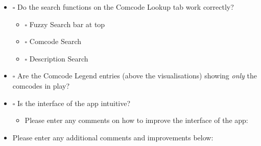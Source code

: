 \documentclass[11pt]{article}
\begin{document}
\vspace*{2cm}

\begin{itemize}
\item $\square$ Do the search functions on the Comcode Lookup tab work correctly?
\begin{itemize}
\item $\square$ Fuzzy Search bar at top
\item $\square$ Comcode Search
\item $\square$ Description Search
\end{itemize}
\item $\square$ Are the Comcode Legend entries (above the visualisations) showing \emph{only} the comcodes in play?
\item $\square$ Is the interface of the app intuitive?
\begin{itemize}
\item Please enter any comments on how to improve the interface of the app:
\end{itemize}
\end{itemize}

\vspace*{6cm}

\begin{itemize}
\item Please enter any additional comments and improvements below:
\end{itemize}
\end{document}
